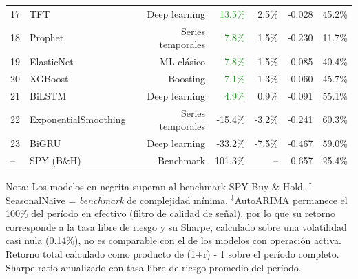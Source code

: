 \begin{table}[htbp]
\begin{tabular}{@{}llrrrrr@{}}
17 & TFT & Deep learning & \textcolor{ForestGreen}{13.5\%} & 2.5\% & -0.028 & 45.2\% \\
18 & Prophet & Series temporales & \textcolor{ForestGreen}{7.8\%} & 1.5\% & -0.230 & 11.7\% \\
19 & ElasticNet & ML cl\'asico & \textcolor{ForestGreen}{7.8\%} & 1.5\% & -0.085 & 40.4\% \\
20 & XGBoost & Boosting & \textcolor{ForestGreen}{7.1\%} & 1.3\% & -0.060 & 45.7\% \\
21 & BiLSTM & Deep learning & \textcolor{ForestGreen}{4.9\%} & 0.9\% & -0.091 & 55.1\% \\
22 & ExponentialSmoothing & Series temporales & \textcolor{BrickRed}{-15.4\%} & -3.2\% & -0.241 & 60.3\% \\
23 & BiGRU & Deep learning & \textcolor{BrickRed}{-33.2\%} & -7.5\% & -0.467 & 59.0\% \\
\midrule
-- & SPY (B\&H) & Benchmark & 101.3\% & -- & 0.657 & 25.4\% \\
\bottomrule
\end{tabular}
\begin{tablenotes}
\small
\item Nota: Los modelos en negrita superan al benchmark SPY Buy \& Hold. \colorbox{naivebg}{$^\dagger$SeasonalNaive} = \textit{benchmark} de complejidad m\'inima. $^\ddagger$AutoARIMA permanece el 100\% del per\'iodo en efectivo (filtro de calidad de se\~nal), por lo que su retorno corresponde a la tasa libre de riesgo y su Sharpe, calculado sobre una volatilidad casi nula (0.14\%), no es comparable con el de los modelos con operaci\'on activa. Retorno total calculado como producto de (1+r) - 1 sobre el per\'iodo completo. Sharpe ratio anualizado con tasa libre de riesgo promedio del per\'iodo.
\end{tablenotes}
\end{table}
